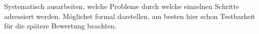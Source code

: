 Systematisch ausarbeiten, welche Probleme durch welche einzelnen Schritte adressiert werden. M\"oglichst formal darstellen, am besten hier schon Testbarkeit f\"ur die sp\"atere Bewertung beachten.